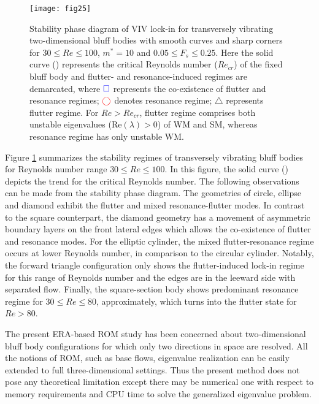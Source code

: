 \documentclass{jfm}
\newcommand{\greensolid}{\raisebox{2pt}{\tikz{\draw[green,solid,line width=1.2pt](0,0) -- (5mm,0);}}}
\begin{document}
 
\begin{figure}
\centering
    \texttt{[image: fig25]}
     \caption{Stability phase diagram of VIV lock-in for transversely vibrating two-dimensional bluff bodies with 
     smooth curves and sharp corners for $ 30 \le Re \le 100$, $m^*=10$ and $0.05 \le F_s \le 0.25$. Here the solid curve 
     ({\protect\greensolid}) represents the critical Reynolds number ($Re_{cr}$) of the fixed bluff body and 
     flutter- and resonance-induced regimes are demarcated, where 
     ${\color{blue} \square}$ represents the co-existence of flutter and resonance regimes; 
     ${\color{red} \bigcirc}$ denotes resonance regime; $\triangle$ represents flutter regime.
     For $Re > Re_{cr}$, flutter regime comprises both unstable eigenvalues (Re$(\lambda) > 0$) 
     of WM and SM, whereas resonance regime has only unstable WM.
     }
         \label{fig:top_chart}
\end{figure}

Figure \ref{fig:top_chart} summarizes the stability regimes of 
transversely vibrating bluff bodies 
for Reynolds number range $ 30 \le Re \le 100$. In this figure, the solid curve
({\protect\greensolid}) depicts 
the trend for the critical Reynolds number. The following observations can be made from 
the stability phase diagram. The geometries of circle, ellipse and diamond exhibit 
the flutter and mixed resonance-flutter modes. In contrast to the square counterpart, 
the diamond geometry has a movement of asymmetric boundary layers on the front lateral 
edges which allows the co-existence of flutter and resonance modes. For the 
elliptic cylinder, the mixed flutter-resonance regime occurs at lower Reynolds number, 
in comparison to the circular cylinder.
Notably, the forward triangle configuration 
only shows the flutter-induced lock-in regime for this range of Reynolds number and the edges are in 
the leeward side with separated flow. 
Finally, the square-section body shows predominant resonance regime for $ 30 \le Re \le 80$, approximately, 
which turns into the flutter state for $Re > 80$.

The present ERA-based ROM study has been concerned about two-dimensional bluff body configurations 
for which only two directions in space are resolved. All the notions of ROM, such as 
base flows, eigenvalue realization can be easily extended to full 
three-dimensional settings. Thus the present method does not pose any theoretical limitation 
except there may be numerical one with respect to memory requirements and CPU time 
to solve the generalized eigenvalue problem.  
 
\end{document}
